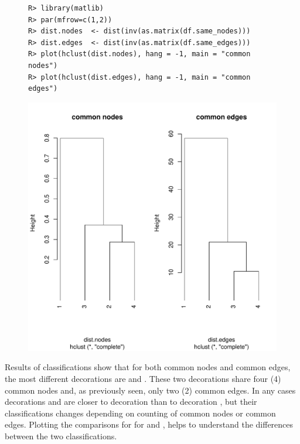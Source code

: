 \documentclass[article]{jss}\usepackage{knitr}
\begin{document}
\begin{figure}[H]
\begin{kframe}
\begin{verbatim}
R> library(matlib)
R> par(mfrow=c(1,2))
R> dist.nodes  <- dist(inv(as.matrix(df.same_nodes)))
R> dist.edges  <- dist(inv(as.matrix(df.same_edges)))
R> plot(hclust(dist.nodes), hang = -1, main = "common nodes")
R> plot(hclust(dist.edges), hang = -1, main = "common edges")
\end{verbatim}
\end{kframe}
\includegraphics[width=\maxwidth]{figure/unnamed-chunk-16-1} 

\end{figure}

Results of classifications show that for both common nodes and common edges, the most different decorations are  and . These two decorations share four (4) common nodes and, as previously seen, only two (2) common edges.
In any cases decorations  and  are closer to decoration  than to decoration , but their classifications changes depending on counting of common nodes or common edges. Plotting the comparisons for for  and , helps to understand the differences between the two classifications.
\end{document}
